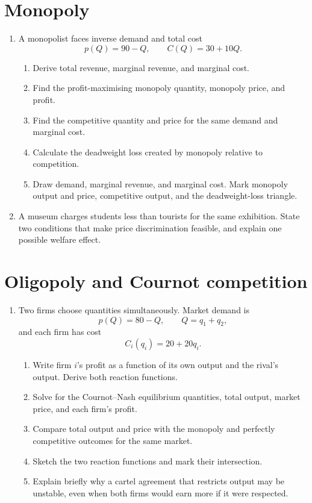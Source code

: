 \documentclass[11pt,a4paper]{article}
\begin{document}
\section{Monopoly}

\begin{enumerate}[label=\textbf{7.\alph*}]
  \item A monopolist faces inverse demand and total cost
  \[
    p(Q)=90-Q,
    \qquad
    C(Q)=30+10Q.
  \]
  \begin{enumerate}[label=(\roman*)]
    \item Derive total revenue, marginal revenue, and marginal cost.
    \item Find the profit-maximising monopoly quantity, monopoly price, and
    profit.
    \item Find the competitive quantity and price for the same demand and
    marginal cost.
    \item Calculate the deadweight loss created by monopoly relative to
    competition.
    \item Draw demand, marginal revenue, and marginal cost. Mark monopoly
    output and price, competitive output, and the deadweight-loss triangle.
  \end{enumerate}

  \item A museum charges students less than tourists for the same exhibition.
  State two conditions that make price discrimination feasible, and explain
  one possible welfare effect.
\end{enumerate}

\section{Oligopoly and Cournot competition}

\begin{enumerate}[label=\textbf{8.\alph*}]
  \item Two firms choose quantities simultaneously. Market demand is
  \[
    p(Q)=80-Q,
    \qquad Q=q_1+q_2,
  \]
  and each firm has cost
  \[
    C_i(q_i)=20+20q_i.
  \]
  \begin{enumerate}[label=(\roman*)]
    \item Write firm \(i\)'s profit as a function of its own output and the
    rival's output. Derive both reaction functions.
    \item Solve for the Cournot--Nash equilibrium quantities, total output,
    market price, and each firm's profit.
    \item Compare total output and price with the monopoly and perfectly
    competitive outcomes for the same market.
    \item Sketch the two reaction functions and mark their intersection.
    \item Explain briefly why a cartel agreement that restricts output may be
    unstable, even when both firms would earn more if it were respected.
  \end{enumerate}
\end{enumerate}

\vfill
\end{document}
